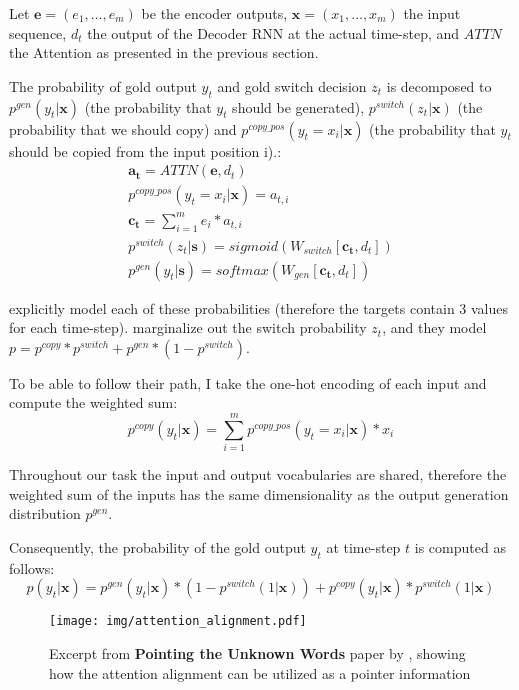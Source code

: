 Let $\boldsymbol{e} = (e_1, \dots, e_m)$ be the encoder outputs, $\boldsymbol{x} = (x_1, \dots, x_m)$ the input sequence, $d_t$ the output of the Decoder RNN at the actual time-step, and $ATTN$ the Attention as presented in the previous section.

The probability of gold output $y_t$ and gold switch decision $z_t$ is decomposed to $p^{gen}(y_t|\boldsymbol{x})$ (the probability that $y_t$ should be generated), $p^{switch}(z_t|\boldsymbol{x})$ (the probability that we should copy) and $p^{copy\_pos}(y_t = x_i |\boldsymbol{x})$ (the probability that $y_t$ should be copied from the input position i).:
\begin{gather}
    \boldsymbol{a_t} = ATTN(\boldsymbol{e}, d_t) \\
    p^{copy\_pos}(y_t = x_i | \boldsymbol{x}) = a_{t, i} \\
    \boldsymbol{c_t} = \sum_{i=1}^m{e_i * a_{t, i}} \\
    p^{switch}(z_t | \boldsymbol{s}) = sigmoid(W_{switch}[\boldsymbol{c_t}, d_t]) \\
    p^{gen}(y_t | \boldsymbol{s}) = softmax(W_{gen}[\boldsymbol{c_t}, d_t])
\end{gather}

\citep{gulcehre2016pointing} explicitly model each of these probabilities (therefore the targets contain 3 values for each time-step). \citep{yang2016referenceaware} marginalize out the switch probability $z_t$, and they model $p = p^{copy} * p^{switch} + p^{gen} * (1 - p^{switch})$.

To be able to follow their path, I take the one-hot encoding of each input and compute the weighted sum:
\begin{equation}
    p^{copy}(y_t|\boldsymbol{x}) = \sum_{i=1}^m{p^{copy\_pos}(y_t = x_i | \boldsymbol{x}) * x_i}
\end{equation}

Throughout our task the input and output vocabularies are shared, therefore the weighted sum of the inputs has the same dimensionality as the output generation distribution $p^{gen}$.

Consequently, the probability of the gold output $y_t$ at time-step $t$ is computed as follows:
\begin{equation}
    p(y_t|\boldsymbol{x}) = p^{gen}(y_t|\boldsymbol{x})*(1-p^{switch}(1|\boldsymbol{x})) + p^{copy}(y_t|\boldsymbol{x})*p^{switch}(1|\boldsymbol{x})
\end{equation}

\begin{figure}[hb]
    \centering
    \texttt{[image: img/attention\_alignment.pdf]}
    \caption{Excerpt from \textbf{Pointing the Unknown Words} paper by \citep{gulcehre2016pointing}, showing how the attention alignment can be utilized as a pointer information}
\end{figure}